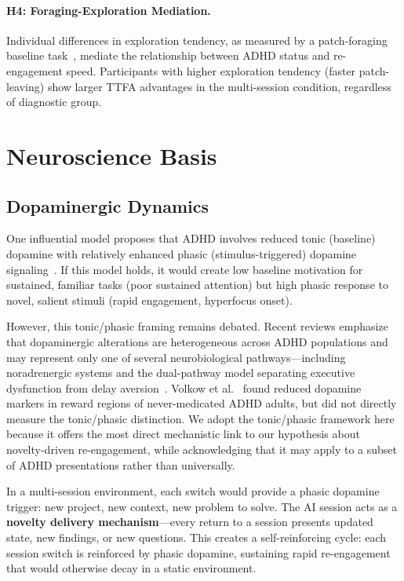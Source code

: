 \documentclass[sigconf,nonacm]{acmart}
\begin{document}
\paragraph{H4: Foraging-Exploration Mediation.} Individual differences in exploration tendency, as measured by a patch-foraging baseline task~\cite{barack2024}, mediate the relationship between ADHD status and re-engagement speed. Participants with higher exploration tendency (faster patch-leaving) show larger TTFA advantages in the multi-session condition, regardless of diagnostic group.

\section{Neuroscience Basis}
\label{sec:neuro}

\subsection{Dopaminergic Dynamics}

One influential model proposes that ADHD involves reduced tonic (baseline) dopamine with relatively enhanced phasic (stimulus-triggered) dopamine signaling~\cite{grace2001, badgaiyan2015}. If this model holds, it would create low baseline motivation for sustained, familiar tasks (poor sustained attention) but high phasic response to novel, salient stimuli (rapid engagement, hyperfocus onset).

However, this tonic/phasic framing remains debated. Recent reviews emphasize that dopaminergic alterations are heterogeneous across ADHD populations and may represent only one of several neurobiological pathways---including noradrenergic systems and the dual-pathway model separating executive dysfunction from delay aversion~\cite{macdonald2024, faraone2021}. Volkow et al.~\cite{volkow2009} found reduced dopamine markers in reward regions of never-medicated ADHD adults, but did not directly measure the tonic/phasic distinction. We adopt the tonic/phasic framework here because it offers the most direct mechanistic link to our hypothesis about novelty-driven re-engagement, while acknowledging that it may apply to a subset of ADHD presentations rather than universally.

In a multi-session environment, each switch would provide a phasic dopamine trigger: new project, new context, new problem to solve. The AI session acts as a \textbf{novelty delivery mechanism}---every return to a session presents updated state, new findings, or new questions. This creates a self-reinforcing cycle: each session switch is reinforced by phasic dopamine, sustaining rapid re-engagement that would otherwise decay in a static environment.
\end{document}
